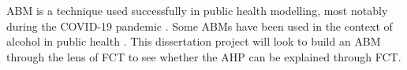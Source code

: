 \ac{ABM} is a technique used successfully in public health modelling, most notably during the COVID-19 pandemic \cite{covidABM}. Some \ac{ABM}s have been used in the context of alcohol in public health \cite{scopingReview}. This dissertation project will look to build an \ac{ABM} through the lens of \ac{FCT} to see whether the \ac{AHP} can be explained through \ac{FCT}.
